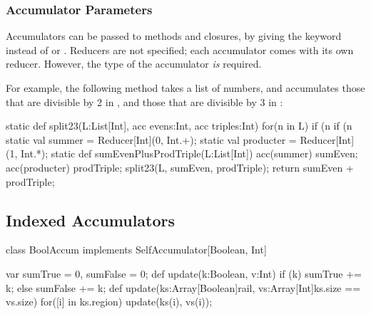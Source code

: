 
\subsubsection{Accumulator Parameters}

Accumulators can be passed to methods and closures, by giving the keyword 
 instead of  or .  Reducers are not specified; each
accumulator comes with its own reducer.  However, the type  of the
accumulator {\em is} required.

For example, the following method takes a list of numbers, and accumulates
those that are divisible by 2 in , and those that are divisible by
3 in : 
\begin{xten}
static def split23(L:List[Int], acc evens:Int, acc triples:Int) {
  for(n in L) {
     if (n %
     if (n %
  }
}
static val summer = Reducer[Int](0, Int.+);
static val producter = Reducer[Int](1, Int.*);
static def sumEvenPlusProdTriple(L:List[Int]) {
  acc(summer) sumEven;
  acc(producter) prodTriple;
  split23(L, sumEven, prodTriple);
  return sumEven + prodTriple;
}
\end{xten}

\subsection{Indexed Accumulators}



\begin{xten}
class BoolAccum implements SelfAccumulator[Boolean, Int] {
  var sumTrue = 0, sumFalse = 0;
  def update(k:Boolean, v:Int) { 
     if (k) sumTrue += k; else sumFalse += k;
  }
  def update(ks:Array[Boolean]{rail}, vs:Array[Int]{ks.size == vs.size}) {
     for([i] in ks.region) update(ks(i), vs(i));  }
  
}
\end{xten}
%

